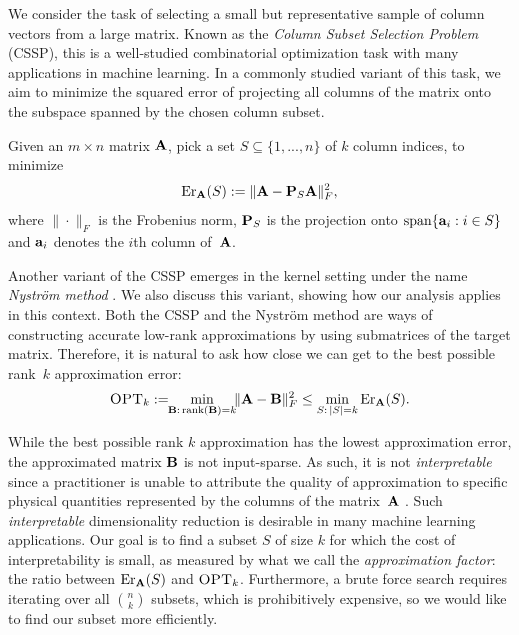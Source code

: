 \documentclass{article}
\begin{document}
We consider the task of selecting a small but representative sample of
column vectors from a large matrix. Known as the \emph{Column Subset Selection
Problem} (CSSP), this is a well-studied combinatorial optimization task with
many applications in machine learning. %
In a 
commonly studied variant of this task, we aim to minimize the
squared error of projecting all columns of the matrix onto the
subspace spanned by the chosen column subset.
\begin{definition}[CSSP]
  Given an $m\times n$ matrix $\A$, pick a set $S\subseteq\{1,...,n\}$ of 
  $k$ column indices, to minimize
  \begin{align*}
   \Er_\A(S) := \|\A - \P_S\A\|_F^2,
  \end{align*}
  where $\|\cdot\|_F$ is the Frobenius norm, $\P_S$ is the
  projection onto $\mathrm{span}\{\a_i:i\in S\}$ and $\a_i$ denotes the $i$th
  column of~$\A$.
\end{definition}
Another variant of the CSSP emerges in the kernel
setting under the name \emph{Nystr\"om method}
\citep{Williams01Nystrom,dm_kernel_JRNL,revisiting-nystrom}. We also
discuss this variant, showing how our analysis applies in this context.
Both the CSSP and the Nystr\"om method are ways of
constructing accurate low-rank approximations by using submatrices of
the target matrix. Therefore, it is natural to ask how
close we can get to the best possible rank~$k$ approximation error:
\begin{align*}
  \opt := \!\!\min_{\B:\,\rank(\B)=k} \!\!\|\A-\B\|_F^2\leq \min_{S:\,|S|=k}\Er_\A(S).
\end{align*}

While the best possible rank $k$ approximation has the lowest
approximation error, the approximated matrix $\B$ is not
{input-sparse}. As such, it is not \emph{interpretable} since a
practitioner is unable to attribute the quality of approximation to
specific physical quantities represented by the columns of the
matrix~$\A$ \citep{mahoney2009cur}. Such \emph{interpretable}
dimensionality reduction is desirable 
in many machine learning applications. 
 Our goal is to find a subset $S$ of size $k$ for which the cost of
 interpretability is small, as measured by what we call the
 \emph{approximation factor}: the ratio
between $\Er_\A(S)$ and $\opt$. Furthermore, a brute force
search requires iterating over all 
${n \choose k}$ subsets, which is prohibitively expensive, so we
would like to find our subset more efficiently.
\end{document}
